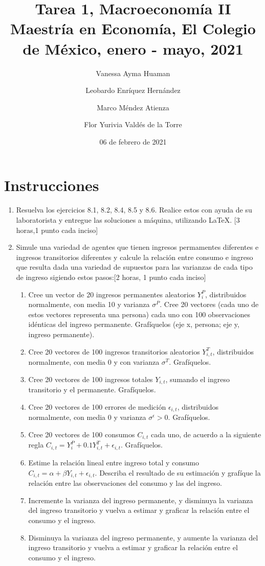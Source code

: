 \documentclass[
]{article}
\title{\textbf{Tarea 1, Macroeconomía II}\\
Maestría en Economía, El Colegio de México, enero - mayo, 2021}
\author{Vanessa Ayma Huaman \and Leobardo Enríquez Hernández \and Marco
Méndez Atienza \and Flor Yurivia Valdés de la Torre}
\date{06 de febrero de 2021}
\begin{document}
\maketitle

\newpage{}

{
\setcounter{tocdepth}{3}
\tableofcontents
}

\newpage

\hypertarget{instrucciones}{%
\section{Instrucciones}\label{instrucciones}}

\begin{enumerate}
\item Resuelva los ejercicios 8.1, 8.2, 8.4, 8.5 y 8.6. Realice estos con ayuda de su laboratorista y entregue las soluciones a máquina, utilizando LaTeX. [3 horas,1 punto cada inciso]
\item Simule una variedad de agentes que tienen ingresos permamentes diferentes e ingresos transitorios diferentes y calcule la relación entre consumo e ingreso que resulta dada una variedad de supuestos para las varianzas de cada tipo de ingreso sigiendo estos pasos:[2 horas, 1 punto cada inciso]
\begin{enumerate}
\item Cree un vector de 20 ingresos permanentes aleatorios $Y_i^P$, distribuidos normalmente, con media 10 y varianza $\sigma^P$. Cree 20 vectores (cada uno de estos vectores representa una persona) cada uno con 100 observaciones idénticas del ingreso permanente. Grafíquelos (eje x, persona; eje y, ingreso permanente).
\item Cree 20 vectores de 100 ingresos transitorios aleatorios $Y_{i,t}^T$, distribuidos normalmente, con media 0 y con varianza $\sigma^T$. Grafíquelos.
\item Cree 20 vectores de 100 ingresos totales $Y_{i,t}$, sumando el ingreso transitorio y el permanente. Grafíquelos.
\item Cree 20 vectores de 100 errores de medición $\epsilon_{i,t}$, distribuidos normalmente, con media 0 y varianza $\sigma^\epsilon>0$. Grafíquelos.
\item Cree  20 vectores de 100 consumos $C_{i,t}$ cada uno, de acuerdo a la siguiente regla $C_{i,t}=Y_i^P+0.1Y_{i,t}^T+\epsilon_{i,t}$. Grafíquelos.
\item Estime la relación lineal entre ingreso total y consumo $C_{i,t}=\alpha+\beta Y_{i,t}+\epsilon_{i,t}$. Describa el resultado de su estimación y grafíque la relación entre las observaciones del consumo y las del ingreso.
\item Incremente la varianza del ingreso permanente, y disminuya la varianza del ingreso transitorio y vuelva a estimar y graficar la relación entre el consumo y el ingreso.
\item Disminuya la varianza del ingreso permanente, y aumente la varianza del ingreso transitorio y vuelva a estimar y graficar la relación entre el consumo y el ingreso.
\end{enumerate}


\end{enumerate}
\end{document}
